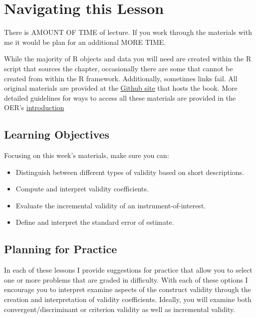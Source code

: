 \documentclass[
  english,
]{book}
\providecommand{\tightlist}{%
  \setlength{\itemsep}{0pt}\setlength{\parskip}{0pt}}
\begin{document}
\hypertarget{navigating-this-lesson-2}{%
\section{Navigating this Lesson}\label{navigating-this-lesson-2}}

There is AMOUNT OF TIME of lecture. If you work through the materials with me it would be plan for an additional MORE TIME.

While the majority of R objects and data you will need are created within the R script that sources the chapter, occasionally there are some that cannot be created from within the R framework. Additionally, sometimes links fail. All original materials are provided at the \href{https://github.com/lhbikos/ReC_Psychometrics}{Github site} that hosts the book. More detailed guidelines for ways to access all these materials are provided in the OER's \protect\hyperlink{ReCintro}{introduction}

\hypertarget{learning-objectives-2}{%
\subsection{Learning Objectives}\label{learning-objectives-2}}

Focusing on this week's materials, make sure you can:

\begin{itemize}
\tightlist
\item
  Distinguish between different types of validity based on short descriptions.
\item
  Compute and interpret validity coefficients.
\item
  Evaluate the incremental validity of an instrument-of-interest.
\item
  Define and interpret the standard error of estimate.
\end{itemize}

\hypertarget{planning-for-practice-2}{%
\subsection{Planning for Practice}\label{planning-for-practice-2}}

In each of these lessons I provide suggestions for practice that allow you to select one or more problems that are graded in difficulty. With each of these options I encourage you to interpret examine aspects of the construct validity through the creation and interpretation of validity coefficients. Ideally, you will examine both convergent/discriminant or criterion validity as well as incremental validity.
\end{document}
